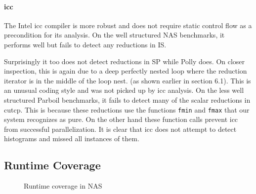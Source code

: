 \paragraph{icc}
The Intel icc compiler is more robust and does not require static
control flow as a precondition for its analysis. On the well
structured NAS benchmarks, it performs well but fails to detect any
reductions in IS.

Surprisingly it too does not detect reductions in SP while Polly does. On
closer inspection, this is again due to a deep perfectly nested loop where
the reduction iterator is in the middle of the loop nest. (as shown
earlier in section 6.1).  This is an unusual coding style and was not
picked up by icc analysis. On the less well structured Parboil
benchmarks, it fails to detect many of the scalar reductions in cutcp.
This is because these reductions use the functions \texttt{fmin} and
\texttt{fmax} that our system recognizes as pure.  On the other hand
these function calls prevent icc from successful parallelization.
 It is clear that icc does not attempt to detect
histograms and missed all instances of them.

\subsection{Runtime Coverage}

\begin{figure}[ht]
  \centering
    \caption{Runtime coverage in NAS}
    \label{npb_coverage}
\end{figure}

